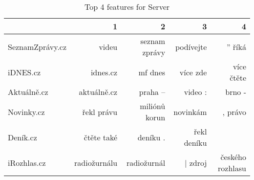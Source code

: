 \begin{table}
\centering
\caption{Top 4 features for Server}
\label{tab:top4_server}
\begin{tabular}{lrrrr}
\toprule
{} &             1 &              2 &            3 &                 4 \\
\midrule
SeznamZprávy.cz &         videu &  seznam zprávy &    podívejte &            ” říká \\
iDNES.cz        &      idnes.cz &        mf dnes &     více zde &        více čtěte \\
Aktuálně.cz     &   aktuálně.cz &        praha – &      video : &            brno - \\
Novinky.cz      &    řekl právu &  miliónů korun &     novinkám &           , právo \\
Deník.cz        &    čtěte také &       deníku . &  řekl deníku &                 ­ \\
iRozhlas.cz     &  radiožurnálu &    radiožurnál &      | zdroj &  českého rozhlasu \\
\bottomrule
\end{tabular}
\end{table}
